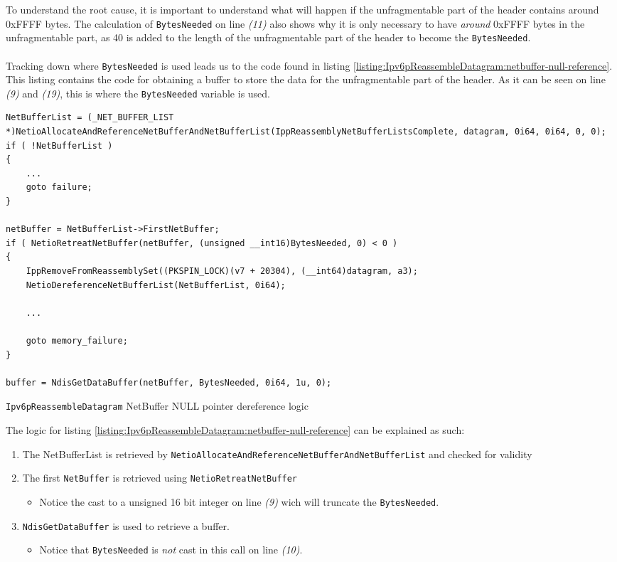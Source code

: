\documentclass{report}
\begin{document}
To understand the root cause, it is important to understand what will happen if the unfragmentable part of the header contains around 0xFFFF bytes. The calculation of \texttt{BytesNeeded} on line \emph{(11)} also shows why it is only necessary to have \emph{around} 0xFFFF bytes in the unfragmentable part, as 40 is added to the length of the unfragmentable part of the header to become the \texttt{BytesNeeded}.
\\
\\
Tracking down where \texttt{BytesNeeded} is used leads us to the code found in listing \ref{listing:Ipv6pReassembleDatagram:netbuffer-null-reference}. This listing contains the code for obtaining a buffer to store the data for the unfragmentable part of the header. As it can be seen on line \emph{(9)} and \emph{(19)}, this is where the \texttt{BytesNeeded} variable is used.

\begin{listing}[H]
\begin{verbatim}
NetBufferList = (_NET_BUFFER_LIST *)NetioAllocateAndReferenceNetBufferAndNetBufferList(IppReassemblyNetBufferListsComplete, datagram, 0i64, 0i64, 0, 0);
if ( !NetBufferList )
{
    ...
    goto failure;
}

netBuffer = NetBufferList->FirstNetBuffer;
if ( NetioRetreatNetBuffer(netBuffer, (unsigned __int16)BytesNeeded, 0) < 0 )
{
    IppRemoveFromReassemblySet((PKSPIN_LOCK)(v7 + 20304), (__int64)datagram, a3);
    NetioDereferenceNetBufferList(NetBufferList, 0i64);

    ...

    goto memory_failure;
}

buffer = NdisGetDataBuffer(netBuffer, BytesNeeded, 0i64, 1u, 0);
\end{verbatim}
\caption{\texttt{Ipv6pReassembleDatagram} NetBuffer NULL pointer dereference logic}
\label{listing:Ipv6pReassembleDatagram:netbuffer-null-reference}
\end{listing}

The logic for listing \ref{listing:Ipv6pReassembleDatagram:netbuffer-null-reference} can be explained as such:
\begin{enumerate}
  \item The NetBufferList is retrieved by \texttt{NetioAllocateAndReferenceNetBufferAndNetBufferList} and checked for validity
  \item The first \texttt{NetBuffer} is retrieved using \texttt{NetioRetreatNetBuffer}
  \begin{itemize}
    \item Notice the cast to a unsigned 16 bit integer on line \emph{(9)} wich will truncate the \texttt{BytesNeeded}.
  \end{itemize}
  \item \texttt{NdisGetDataBuffer} is used to retrieve a buffer.
  \begin{itemize}
    \item Notice that \texttt{BytesNeeded} is \emph{not} cast in this call on line \emph{(10)}.
  \end{itemize}
\end{enumerate}
\end{document}
